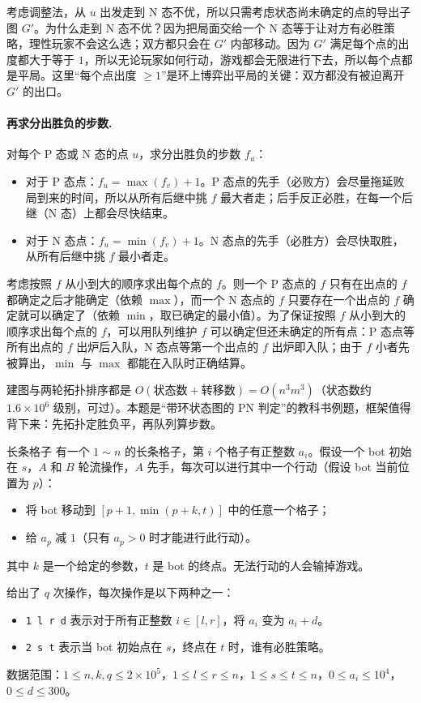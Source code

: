 考虑调整法，从 $u$ 出发走到 N 态不优，所以只需考虑状态尚未确定的点的导出子图 $G'$。为什么走到 N 态不优？因为把局面交给一个 N 态等于让对方有必胜策略，理性玩家不会这么选；双方都只会在 $G'$ 内部移动。因为 $G'$ 满足每个点的出度都大于等于 $1$，所以无论玩家如何行动，游戏都会无限进行下去，所以每个点都是平局。这里“每个点出度 $\ge1$”是环上博弈出平局的关键：双方都没有被迫离开 $G'$ 的出口。

\paragraph{再求分出胜负的步数.} 对每个 P 态或 N 态的点 $u$，求分出胜负的步数 $f_u$：
\begin{itemize}
\item 对于 P 态点：$f_u=\max(f_v)+1$。P 态点的先手（必败方）会尽量拖延败局到来的时间，所以从所有后继中挑 $f$ 最大者走；后手反正必胜，在每一个后继（N 态）上都会尽快结束。
\item 对于 N 态点：$f_u=\min(f_v)+1$。N 态点的先手（必胜方）会尽快取胜，从所有后继中挑 $f$ 最小者走。
\end{itemize}
考虑按照 $f$ 从小到大的顺序求出每个点的 $f$。则一个 P 态点的 $f$ 只有在出点的 $f$ 都确定之后才能确定（依赖 $\max$），而一个 N 态点的 $f$ 只要存在一个出点的 $f$ 确定就可以确定了（依赖 $\min$，取已确定的最小值）。为了保证按照 $f$ 从小到大的顺序求出每个点的 $f$，可以用队列维护 $f$ 可以确定但还未确定的所有点：P 态点等所有出点的 $f$ 出炉后入队，N 态点等第一个出点的 $f$ 出炉即入队；由于 $f$ 小者先被算出，$\min$ 与 $\max$ 都能在入队时正确结算。

\cost 建图与两轮拓扑排序都是 $O(\text{状态数}+\text{转移数})=O(n^3m^3)$（状态数约 $1.6\times10^{6}$ 级别，可过）。本题是“带环状态图的 PN 判定”的教科书例题，框架值得背下来：先拓扑定胜负平，再队列算步数。


\begin{problem}{长条格子}
有一个 $1\sim n$ 的长条格子，第 $i$ 个格子有正整数 $a_i$。假设一个 bot 初始在 $s$，$A$ 和 $B$ 轮流操作，$A$ 先手，每次可以进行其中一个行动（假设 bot 当前位置为 $p$）：
\begin{itemize}
\item 将 bot 移动到 $[p+1,\min(p+k,t)]$ 中的任意一个格子；
\item 给 $a_p$ 减 $1$（只有 $a_p>0$ 时才能进行此行动）。
\end{itemize}
其中 $k$ 是一个给定的参数，$t$ 是 bot 的终点。无法行动的人会输掉游戏。

给出了 $q$ 次操作，每次操作是以下两种之一：
\begin{itemize}
\item \texttt{1 l r d} 表示对于所有正整数 $i\in[l,r]$，将 $a_i$ 变为 $a_i+d$。
\item \texttt{2 s t} 表示当 bot 初始点在 $s$，终点在 $t$ 时，谁有必胜策略。
\end{itemize}
数据范围：$1\le n,k,q\le2\times10^{5}$，$1\le l\le r\le n$，$1\le s\le t\le n$，$0\le a_i\le10^{4}$，$0\le d\le300$。
\end{problem}

